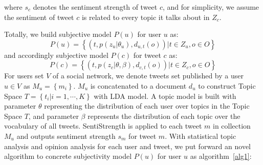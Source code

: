 \begin{landscape}
\begin{itemize*}
where $ s_{c} $ denotes the sentiment strength of tweet $ c $, and for simplicity, we assume the sentiment of tweet $ c $ is related to every topic it talks about in $ Z_{c} $.

\end{itemize*}

Totally, we build subjective model $ P\left( u \right) $ for user $ u $ as:
\begin{equation}
\label{subuser}
P\left( u \right)= \left\lbrace \left( t, p\left( z_{u} \vert \theta_{u} \right), d_{u,t}\left( o \right) \right)  \vert t \in Z_{u}, o \in O  \right\rbrace  
\end{equation}
and accordingly subjective model $ P\left( c \right) $ for tweet $ c $ as:
\begin{equation}
\label{subtweet}
P\left( c \right)= \left\lbrace \left( t, p\left( z_{c} \vert \theta, \beta \right), d_{c,t}\left( o \right) \right)  \vert t \in Z_{c}, o \in O  \right\rbrace  
\end{equation}
For users set $ V $ of a social network, we denote tweets set published by a user $ u \in V $ as $ M_{u}=\left\lbrace m_{i} \right\rbrace$. $ M_{u} $ is concatenated to a document $ d_{u} $ to construct Topic Space $ T=\left\lbrace t_{i} \vert i=1, \cdots, K \right\rbrace $ with LDA model.
A topic model is built with parameter $ \theta $ representing the distribution of each user over topics in the Topic Space $ T $, and
parameter $ \beta $ represents the distribution of each topic over the vocabulary of all tweets. SentiStrength is applied to each tweet $ m $ in collection $ M_{u} $ and outputs sentiment strength $ s_{m} $ for tweet $ m $. 
With statistical topic analysis and opinion analysis for each user and tweet, we put forward an novel algorithm to concrete subjectivity model $ P(u) $ for user $ u $ as algorithm~\ref{alg1}:


\end{landscape}
